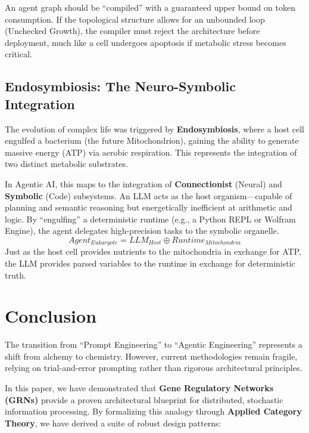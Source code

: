 \documentclass[11pt, a4paper]{article}
\begin{document}
An agent graph should be ``compiled'' with a guaranteed upper bound on token consumption. If the topological structure allows for an unbounded loop (Unchecked Growth), the compiler must reject the architecture before deployment, much like a cell undergoes apoptosis if metabolic stress becomes critical.

\subsection{Endosymbiosis: The Neuro-Symbolic Integration}
The evolution of complex life was triggered by \textbf{Endosymbiosis}, where a host cell engulfed a bacterium (the future Mitochondrion), gaining the ability to generate massive energy (ATP) via aerobic respiration. This represents the integration of two distinct metabolic substrates.

In Agentic AI, this maps to the integration of \textbf{Connectionist} (Neural) and \textbf{Symbolic} (Code) subsystems. An LLM acts as the host organism---capable of planning and semantic reasoning but energetically inefficient at arithmetic and logic. By ``engulfing'' a deterministic runtime (e.g., a Python REPL or Wolfram Engine), the agent delegates high-precision tasks to the symbolic organelle.
\begin{equation}
    Agent_{Eukaryote} = LLM_{Host} \oplus Runtime_{Mitochondria}
\end{equation}
Just as the host cell provides nutrients to the mitochondria in exchange for ATP, the LLM provides parsed variables to the runtime in exchange for deterministic truth.

\section{Conclusion}

The transition from ``Prompt Engineering'' to ``Agentic Engineering'' represents a shift from alchemy to chemistry. However, current methodologies remain fragile, relying on trial-and-error prompting rather than rigorous architectural principles.

In this paper, we have demonstrated that \textbf{Gene Regulatory Networks (GRNs)} provide a proven architectural blueprint for distributed, stochastic information processing. By formalizing this analogy through \textbf{Applied Category Theory}, we have derived a suite of robust design patterns:
\end{document}
